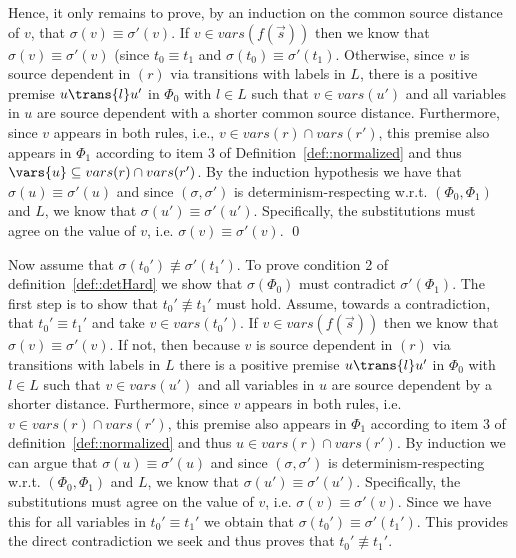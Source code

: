 Hence, it only remains to prove, by an induction on the common source distance of $v$, that $\sigma(v) \equiv \sigma'(v)$.
If $v\in vars(f(\overrightarrow s))$ then we know that $\sigma(v) \equiv \sigma'(v)$ (since $t_0 \equiv t_1$ and $\sigma(t_0) \equiv \sigma'(t_1)$.
Otherwise, since $v$ is source dependent in $(r)$
via transitions with labels in $L$,
there is a positive premise
$u \trans{l} u'$ in $\Phi_0$ with $l\in L$
such that $v\in vars(u')$ and all variables in $u$ are source
dependent with a shorter common source distance.
Furthermore,
since $v$ appears in both rules, i.e., $v \in vars(r) \cap vars(r')$,
this premise also appears in $\Phi_1$ according
to item 3 of Definition~\ref{def::normalized} and thus $\vars{u} \subseteq vars(r) \cap vars(r')$.
By the induction hypothesis we have that $\sigma(u)\equiv \sigma'(u)$ and since $(\sigma,\sigma')$
is determinism-respecting w.r.t. $(\Phi_0, \Phi_1)$ and $L$, we know that
$\sigma(u') \equiv \sigma'(u')$. Specifically, the substitutions
must agree on the value of $v$, i.e.
$\sigma(v) \equiv \sigma'(v)$. \hfill\qed


\iffalse
Now assume that $\sigma(t_0') \not\equiv \sigma'(t_1')$.
To prove condition 2 of definition~\ref{def::detHard} we show that
$\sigma(\Phi_0)$ must contradict $\sigma'(\Phi_1)$.
The first step is to show that $t_0' \not\equiv t_1'$ must hold.
Assume, towards
a contradiction, that $t_0' \equiv t_1'$ and take $v\in vars(t_0')$.
If $v\in vars(f(\overrightarrow s))$ then we know that $\sigma(v) \equiv \sigma'(v)$.
If not, then because $v$ is source dependent in $(r)$
via transitions with labels in $L$
there is a positive premise
$u \trans{l} u'$ in $\Phi_0$ with $l\in L$
such that $v\in vars(u')$ and all variables in $u$ are source
dependent by a shorter distance.
Furthermore,
since $v$ appears in both rules, i.e. $v \in vars(r) \cap vars(r')$,
this premise also appears in $\Phi_1$ according
to item 3 of definition~\ref{def::normalized} and thus $u \in vars(r) \cap vars(r')$.
By induction we can argue that $\sigma(u)\equiv \sigma'(u)$ and since $(\sigma,\sigma')$
is determinism-respecting w.r.t. $(\Phi_0, \Phi_1)$ and $L$, we know that
$\sigma(u')\equiv\sigma'(u')$. Specifically, the substitutions
must agree on the value of $v$, i.e.
$\sigma(v) \equiv \sigma'(v)$.
Since we have this for all variables in $t_0'\equiv t_1'$ we obtain that
$\sigma(t_0') \equiv \sigma'(t_1')$. This provides the direct contradiction we seek
and thus proves that $t_0' \not\equiv t_1'$.

